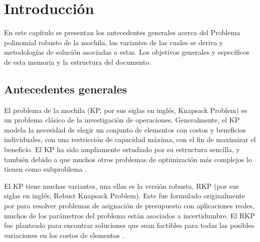\documentclass[spanish, a4paper, 12pt, openany,final]{book}
\begin{document}
\newpage
{ 
\listoffigures}


\newpage
{}   %
\setcounter{page}{1}                                    %


\chapter{Introducción}
En este capítulo se presentan los antecedentes generales acerca del Problema polinomial robusto de la mochila, las variantes de las cuales se deriva y metodologías de solución asociadas a estas. Los objetivos generales y específicos de esta memoria y la estructura del documento.


\section{Antecedentes generales}

El problema de la mochila (KP, por sus siglas en inglés, Knapsack Problem) es un problema clásico de la investigación de operaciones. Generalmente, el KP modela la necesidad de elegir un conjunto de elementos con costos y beneficios individuales, con una restricción de capacidad máxima, con el fin de maximizar el beneficio. El KP ha sido ampliamente estudiado por su estructura sencilla, y también debido a que muchos otros problemas de optimización más complejos lo tienen como subproblema \citep*{martello_knapsack_1990}.

El KP tiene muchas  variantes, una ellas es la versión robusta, RKP (por sus siglas en inglés, Robust Knapsack Problem). Este fue formulado originalmente por \cite{eilon_application_1987} para resolver problemas de asignación de presupuesto con aplicaciones reales, muchos de los parámetros del problema están asociados a incertidumbre. El RKP fue planteado para encontrar soluciones que sean factibles para todas las posibles variaciones en los costos de elementos \citep{monaci_exact_2013}.
\end{document}
